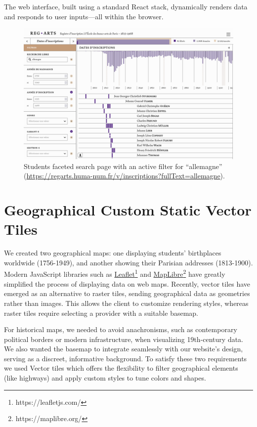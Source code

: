 \documentclass[final]{anthology-ch} %
\begin{document}
The web interface, built using a standard React stack, dynamically renders data and responds to user inputs—all within the browser.

\begin{figure}[t!]
  \centering
  \includegraphics[width=1\linewidth]{figures/faceted_search.png}
  \caption{Students faceted search page with an active filter for “allemagne” (\href{https://regarts.huma-num.fr/v/inscriptions?fullText=allemagne}{https://regarts.huma-num.fr/v/inscriptions?fullText=allemagne}).}
  \label{fig:faceted_search}
\end{figure}

\section{Geographical Custom Static Vector Tiles}
We created two geographical maps: one displaying students’ birthplaces worldwide (1756-1949), and another showing their Parisian addresses (1813-1900). Modern JavaScript libraries such as \href{https://leafletjs.com/}{Leaflet}\footnote{https://leafletjs.com/} and \href{https://maplibre.org/}{MapLibre}\footnote{https://maplibre.org/} have greatly simplified the process of displaying data on web maps. Recently, vector tiles have emerged as an alternative to raster tiles, sending geographical data as geometries rather than images. This allows the client to customize rendering styles, whereas raster tiles require selecting a provider with a suitable basemap.

For historical maps, we needed to avoid anachronisms, such as contemporary political borders or modern infrastructure, when visualizing 19th-century data. We also wanted the basemap to integrate seamlessly with our website’s design, serving as a discreet, informative background. To satisfy these two requirements we used Vector tiles which offers the flexibility to filter geographical elements (like highways) and apply custom styles to tune colors and shapes.
\end{document}
